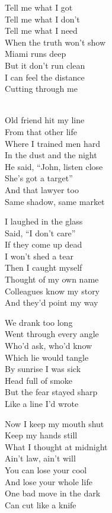 \begin{lyrics}
Tell me what I got\\
Tell me what I don’t\\
Tell me what I need\\
When the truth won’t show\\
Miami runs deep\\
But it don’t run clean\\
I can feel the distance\\
Cutting through me

\\
Old friend hit my line\\
From that other life\\
Where I trained men hard\\
In the dust and the night\\
He said, “John, listen close\\
She’s got a target”\\
And that lawyer too\\
Same shadow, same market

I laughed in the glass\\
Said, “I don’t care”\\
If they come up dead\\
I won’t shed a tear\\
Then I caught myself\\
Thought of my own name\\
Colleagues know my story\\
And they’d point my way

We drank too long\\
Went through every angle\\
Who’d ask, who’d know\\
Which lie would tangle\\
By sunrise I was sick\\
Head full of smoke\\
But the fear stayed sharp\\
Like a line I’d wrote

Now I keep my mouth shut\\
Keep my hands still\\
What I thought at midnight\\
Ain’t law, ain’t will\\
You can lose your cool\\
And lose your whole life\\
One bad move in the dark\\
Can cut like a knife


\end{lyrics}
